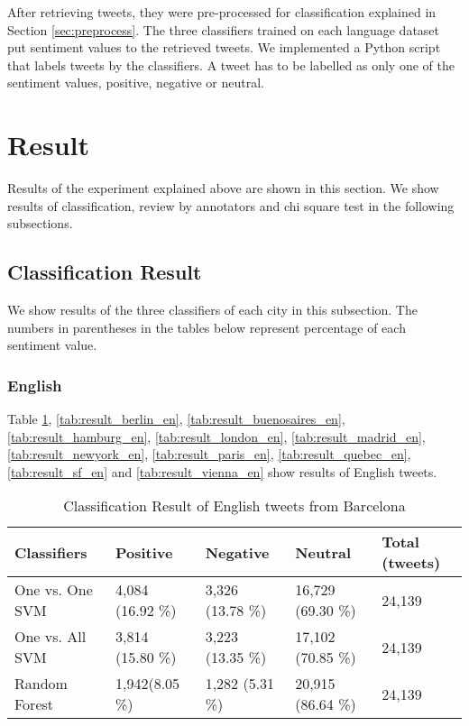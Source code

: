 After retrieving tweets, they were pre-processed for classification explained in Section \ref{sec:preprocess}.
The three classifiers trained on each language dataset put sentiment values to the retrieved tweets.
We implemented a Python script that labels tweets by the classifiers.
A tweet has to be labelled as only one of the sentiment values, positive, negative or neutral.

\section{Result}\label{sec:result}
Results of the experiment explained above are shown in this section.
We show results of classification, review by annotators and chi square test in the following subsections.
\subsection{Classification Result}
We show results of the three classifiers of each city in this subsection.
The numbers in parentheses in the tables below represent percentage of each sentiment value.

\subsubsection{English}
Table \ref{tab:result_barcelona_en}, \ref{tab:result_berlin_en}, \ref{tab:result_buenosaires_en}, \ref{tab:result_hamburg_en}, \ref{tab:result_london_en}, \ref{tab:result_madrid_en}, \ref{tab:result_newyork_en}, \ref{tab:result_paris_en}, \ref{tab:result_quebec_en}, \ref{tab:result_sf_en} and \ref{tab:result_vienna_en} show results of English tweets.
\begin{table}[ht]
	\caption{Classification Result of English tweets from Barcelona}
	\begin{tabular}{|l|p{1.8cm}|p{1.8cm}|p{1.8cm}|p{1.8cm}|} \hline
	Classifiers & Positive & Negative & Neutral & Total (tweets)\\ \hline
	One vs. One SVM & 4,084 (16.92 \%) & 3,326 (13.78 \%) & 16,729 (69.30 \%) & 24,139\\ \hline
	One vs. All SVM & 3,814 (15.80 \%) & 3,223 (13.35 \%) & 17,102 (70.85 \%) & 24,139  \\ \hline
	Random Forest & 1,942\newline (8.05 \%) & 1,282 \newline(5.31 \%) & 20,915 (86.64 \%) & 24,139 \\ \hline
	\end{tabular}
	\label{tab:result_barcelona_en}
\end{table}

